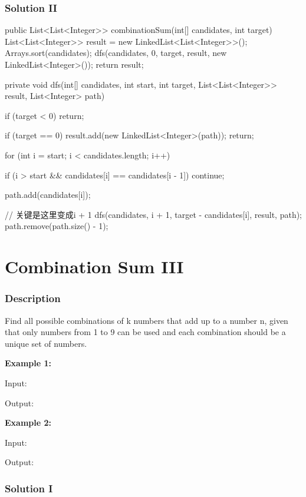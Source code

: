 \newpage

\subsubsection{Solution II}

\begin{Code}
public List<List<Integer>> combinationSum(int[] candidates, int target) {
    List<List<Integer>> result = new LinkedList<List<Integer>>();
    Arrays.sort(candidates);
    dfs(candidates, 0, target, result, new LinkedList<Integer>());
    return result;
}

private void dfs(int[] candidates, int start, int target, List<List<Integer>> result, List<Integer> path) {
    if (target < 0) {
        return;
    }

    if (target == 0) {
        result.add(new LinkedList<Integer>(path));
        return;
    }

    for (int i = start; i < candidates.length; i++) {
        if (i > start && candidates[i] == candidates[i - 1]) {
            continue;
        }

        path.add(candidates[i]);

        // 关键是这里变成i + 1
        dfs(candidates, i + 1, target - candidates[i], result, path);
        path.remove(path.size() - 1);
    }
}
\end{Code}

\newpage

\section{Combination Sum III} %

\subsubsection{Description}
Find all possible combinations of k numbers that add up to a number n, given that only numbers from 1 to 9 can be used and each combination should be a unique set of numbers.

\textbf{Example 1:}

Input: 

Output: \code{[[1,2,4]]}

\textbf{Example 2:}

Input: 

Output: \code{[[1,2,6], [1,3,5], [2,3,4]]}

\subsubsection{Solution I}

